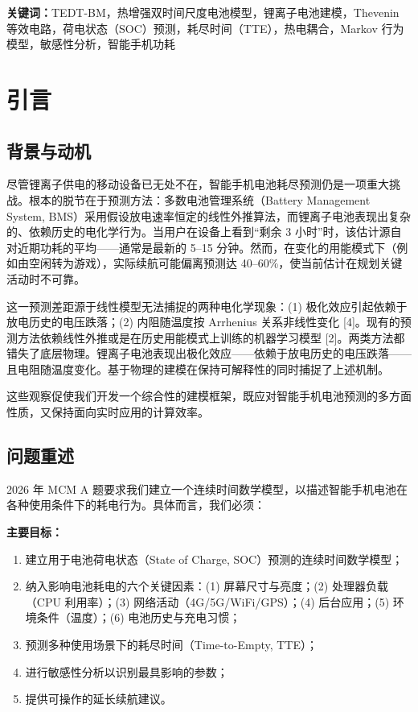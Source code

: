 \documentclass[11pt,a4paper]{ctexart}
\begin{document}
\noindent\textbf{关键词：}TEDT-BM，热增强双时间尺度电池模型，锂离子电池建模，Thevenin 等效电路，荷电状态（SOC）预测，耗尽时间（TTE），热电耦合，Markov 行为模型，敏感性分析，智能手机功耗

\newpage

\section{引言}

\subsection{背景与动机}

尽管锂离子供电的移动设备已无处不在，智能手机电池耗尽预测仍是一项重大挑战。根本的脱节在于预测方法：多数电池管理系统（Battery Management System, BMS）采用假设放电速率恒定的线性外推算法，而锂离子电池表现出复杂的、依赖历史的电化学行为。当用户在设备上看到“剩余 3 小时”时，该估计源自对近期功耗的平均——通常是最新的 5--15 分钟。然而，在变化的用能模式下（例如由空闲转为游戏），实际续航可能偏离预测达 40--60\%，使当前估计在规划关键活动时不可靠。

这一预测差距源于线性模型无法捕捉的两种电化学现象：(1) 极化效应引起依赖于放电历史的电压跌落；(2) 内阻随温度按 Arrhenius 关系非线性变化 [4]。现有的预测方法依赖线性外推或是在历史用能模式上训练的机器学习模型 [2]。两类方法都错失了底层物理。锂离子电池表现出极化效应——依赖于放电历史的电压跌落——且电阻随温度变化。基于物理的建模在保持可解释性的同时捕捉了上述机制。

这些观察促使我们开发一个综合性的建模框架，既应对智能手机电池预测的多方面性质，又保持面向实时应用的计算效率。

\subsection{问题重述}

2026 年 MCM A 题要求我们建立一个连续时间数学模型，以描述智能手机电池在各种使用条件下的耗电行为。具体而言，我们必须：

\textbf{主要目标：}
\begin{enumerate}[leftmargin=2em,itemsep=0.15em]
\item 建立用于电池荷电状态（State of Charge, SOC）预测的连续时间数学模型；
\item 纳入影响电池耗电的六个关键因素：(1) 屏幕尺寸与亮度；(2) 处理器负载（CPU 利用率）；(3) 网络活动（4G/5G/WiFi/GPS）；(4) 后台应用；(5) 环境条件（温度）；(6) 电池历史与充电习惯；
\item 预测多种使用场景下的耗尽时间（Time-to-Empty, TTE）；
\item 进行敏感性分析以识别最具影响的参数；
\item 提供可操作的延长续航建议。
\end{enumerate}
\end{document}
